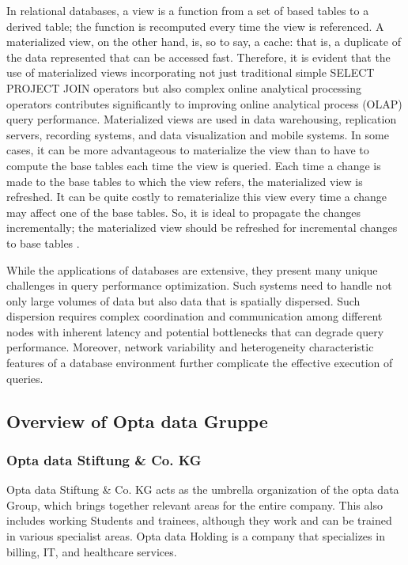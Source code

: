 In relational databases, a view is a function from a set of based tables to a derived table; the function is recomputed every time the view is referenced. A materialized view, on the other hand, is, so to say, a cache: that is, a duplicate of the data represented that can be accessed fast. Therefore, it is evident that the use of materialized views incorporating not just traditional simple SELECT PROJECT JOIN operators but also complex online analytical processing operators contributes significantly to improving online analytical process (OLAP) query performance. Materialized views are used in data warehousing, replication servers, recording systems, and data visualization and mobile systems. In some cases, it can be more advantageous to materialize the view than to have to compute the base tables each time the view is queried. Each time a change is made to the base tables to which the view refers, the materialized view is refreshed. It can be quite costly to rematerialize this view every time a change may affect one of the base tables. So, it is ideal to propagate the changes incrementally; the materialized view should be refreshed for incremental changes to base tables \cite{Data_warehousing,efficient_incremental,rashid2009role}.

While the applications of databases are extensive, they present many unique challenges in query performance optimization. Such systems need to handle not only large volumes of data but also data that is spatially dispersed. Such dispersion requires complex coordination and communication among different nodes with inherent latency and potential bottlenecks that can degrade query performance. Moreover, network variability and heterogeneity characteristic features of a database environment further complicate the effective execution of queries.

\subsection{Overview of Opta data Gruppe}
\subsubsection{Opta data Stiftung \& Co. KG }
Opta data Stiftung \& Co. KG acts as the umbrella organization of the opta data Group, which brings together relevant areas for the entire company. This also includes working Students and trainees, although they work and can be trained in various specialist areas. Opta data Holding is a company that specializes in billing, IT, and healthcare services.


